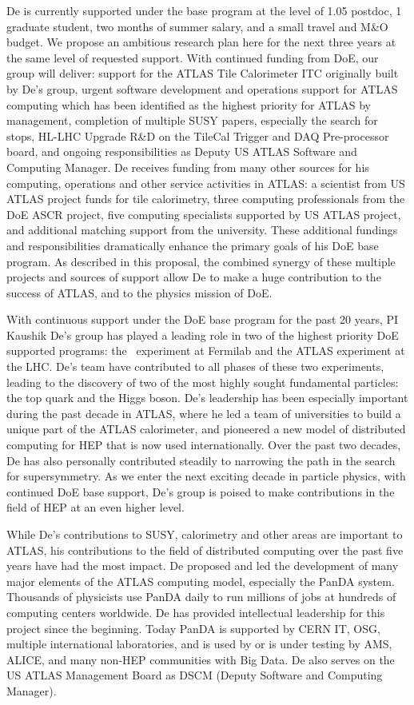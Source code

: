 
De is currently supported under the base program at the level of 1.05 postdoc, 1 graduate student, two months of summer salary, and a small travel and M\&O budget. We propose an ambitious research plan here for the next three years at the same level of requested support. With continued funding from DoE, our group will deliver: support for the ATLAS Tile Calorimeter ITC originally built by De's group, urgent software development and operations support for ATLAS computing which has been identified as the highest priority for ATLAS by management, completion of multiple SUSY papers, especially the search for stops, HL-LHC Upgrade R\&D on the TileCal Trigger and DAQ Pre-processor board, and ongoing responsibilities as Deputy US ATLAS Software and Computing Manager. De receives funding from many other sources for his computing, operations and other service activities in ATLAS: a scientist from US ATLAS project funds for tile calorimetry, three computing professionals from the DoE ASCR project, five computing specialists supported by US ATLAS project, and additional matching support from the university. These additional fundings and responsibilities dramatically enhance the primary goals of his DoE base program. As described in this proposal, the combined synergy of these multiple projects and sources of support allow De to make a huge contribution to the success of ATLAS, and to the physics mission of DoE.

With continuous support under the DoE base program for the past 20 years, PI Kaushik De's group has played a leading role in two of the highest priority DoE supported programs: the \ experiment at Fermilab and the ATLAS experiment at the LHC. De's team have contributed to all phases of these two experiments, leading to the discovery of two of the most highly sought fundamental particles: the top quark and the Higgs boson. De's leadership has been especially important during the past decade in ATLAS, where he led a team of universities to build a unique part of the ATLAS calorimeter, and pioneered a new model of distributed computing for HEP that is now used internationally. Over the past two decades, De has also personally contributed steadily to narrowing the path in the search for supersymmetry. As we enter the next exciting decade in particle physics, with continued DoE base support, De's group is poised to make contributions in the field of HEP at an even higher level.

While De's contributions to SUSY, calorimetry and other areas are important to ATLAS, his contributions to the field of distributed computing over the past five years have had the most impact. De proposed and led the development of many major elements of the ATLAS computing model, especially the PanDA system. Thousands of physicists use PanDA daily to run millions of jobs at hundreds of computing centers worldwide. De has provided intellectual leadership for this project since the beginning. Today PanDA is supported by CERN IT, OSG, multiple international laboratories, and is used by or is under testing by AMS, ALICE, and many non-HEP communities with Big Data. De also serves on the US ATLAS Management Board as DSCM (Deputy Software and Computing Manager).

